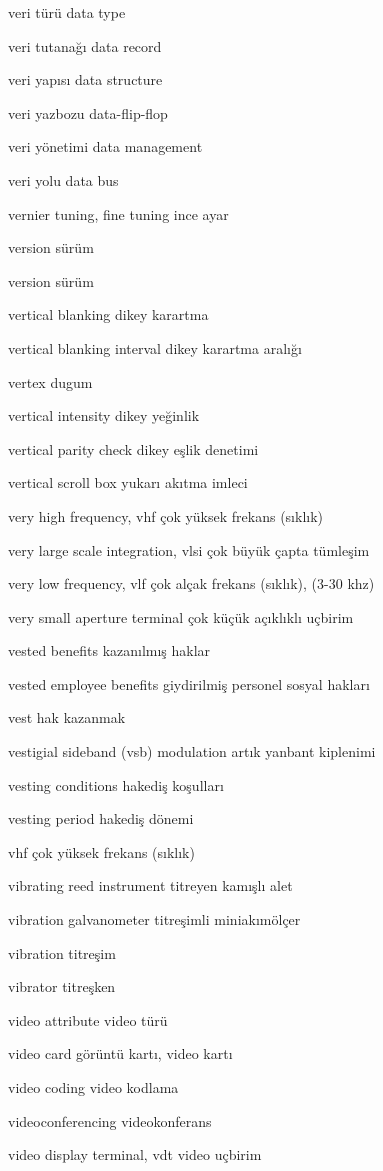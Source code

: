 \documentclass[12pt,fleqn]{article}\usepackage{../../common}
\begin{document}
veri türü data type

veri tutanağı data record

veri yapısı data structure

veri yazbozu data-flip-flop

veri yönetimi data management

veri yolu data bus

vernier tuning, fine tuning ince ayar

version sürüm

version sürüm

vertical blanking dikey karartma

vertical blanking interval dikey karartma aralığı

vertex dugum 

vertical intensity dikey yeğinlik

vertical parity check dikey eşlik denetimi

vertical scroll box yukarı akıtma imleci

very high frequency, vhf çok yüksek frekans (sıklık)

very large scale integration, vlsi çok büyük çapta tümleşim

very low frequency, vlf çok alçak frekans (sıklık), (3-30 khz)

very small aperture terminal çok küçük açıklıklı uçbirim

vested benefits kazanılmış haklar

vested employee benefits giydirilmiş personel sosyal hakları

vest hak kazanmak

vestigial sideband (vsb) modulation artık yanbant kiplenimi

vesting conditions hakediş koşulları

vesting period hakediş dönemi

vhf çok yüksek frekans (sıklık)

vibrating reed instrument titreyen kamışlı alet

vibration galvanometer titreşimli miniakımölçer

vibration titreşim

vibrator titreşken

video attribute video türü

video card görüntü kartı, video kartı

video coding video kodlama

videoconferencing videokonferans

video display terminal, vdt video uçbirim
\end{document}
